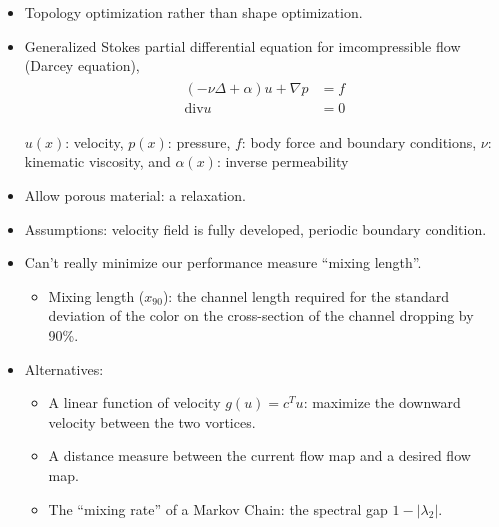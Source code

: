 \documentclass[12pt,t]{beamer}
\begin{document}
\begin{frame}
 \begin{itemize}
  \item Topology optimization rather than shape optimization. 
  \item Generalized Stokes partial differential equation for imcompressible flow (Darcey equation),
       \begin{eqnarray*}
          \begin{aligned}
        ( -\nu\Delta + \alpha ) u +\nabla  p & = f\\
        \text{div} u& =  0
          \end{aligned}
       \end{eqnarray*}

       $u(x)$: velocity, $p(x)$: pressure, $f$: body force and boundary conditions, $\nu$: kinematic viscosity, and $\alpha(x)$: inverse permeability
 \item Allow porous material: a relaxation.
 \item Assumptions: velocity field is fully developed, periodic boundary condition.
  \end{itemize}
\end{frame}
\begin{frame}
  \begin{itemize}
    \item Can't really minimize our performance measure ``mixing length''.
    \vspace{-0.3cm}
    \begin{itemize}
          \item Mixing length ($x_{90}$): the channel length required for the standard deviation of the color on the cross-section of the channel dropping by 90\%.
    \end{itemize}
    \item Alternatives:
       \begin{itemize}
          \item A linear function of velocity $g(u) = c^Tu$: maximize the downward velocity between the two vortices.
          \item A distance measure between the current flow map and a desired flow map.
          \item The ``mixing rate'' of a Markov Chain: the spectral gap $1-|\lambda_2|$.
       \end{itemize}
  \end{itemize}
\end{frame}
\end{document}
